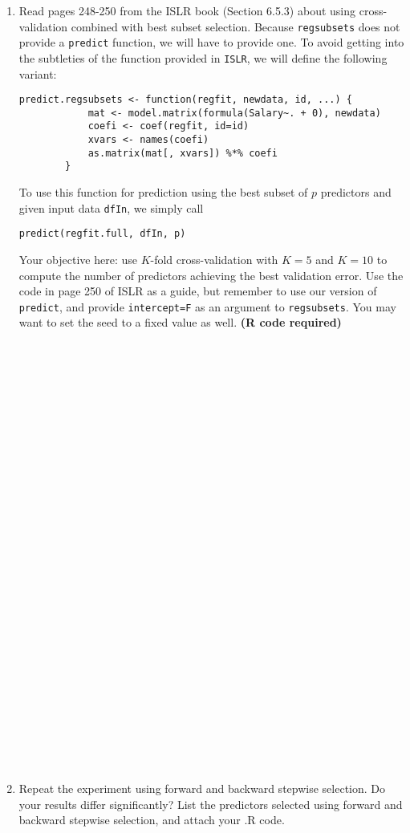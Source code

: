 \documentclass{article}
\begin{document}
\begin{enumerate}
    \item Read pages 248-250 from the ISLR book (Section 6.5.3) about using
    cross-validation combined with best subset selection. Because
    \texttt{regsubsets} does not provide a \texttt{predict} function, we will
    have to provide one. To avoid getting into the subtleties of the function
    provided in \texttt{ISLR}, we will define the following variant:
    \begin{Verbatim}[frame=single]
        predict.regsubsets <- function(regfit, newdata, id, ...) {
            mat <- model.matrix(formula(Salary~. + 0), newdata)
            coefi <- coef(regfit, id=id)
            xvars <- names(coefi)
            as.matrix(mat[, xvars]) %*% coefi
        }
    \end{Verbatim}
    To use this function for prediction using the best subset of $p$ predictors
    and given input data \texttt{dfIn}, we simply call
    \begin{Verbatim}[frame=single]
        predict(regfit.full, dfIn, p)
    \end{Verbatim}
    Your objective here: use $K$-fold cross-validation with $K = 5$ and $K = 10$
    to compute the number of predictors achieving the best validation error. Use
    the code in page 250 of ISLR as a guide, but remember to use our version of
    \texttt{predict}, and provide \texttt{intercept=F} as an argument to
    \texttt{regsubsets}. You may want to set the seed to a fixed value as well. \textbf{(R code required)}


\begin{Verbatim}[frame=single]

































\end{Verbatim}

\newpage
\item Repeat the experiment using forward and backward stepwise selection. Do
your results differ significantly? List the predictors selected using forward
and backward stepwise selection, and attach your .R code.
    \begin{Verbatim}[frame=single]
    
    
    
    
    
    
    
    
    
    
    
    
    
    
    
    
    \end{Verbatim}
\end{enumerate}
\end{document}
